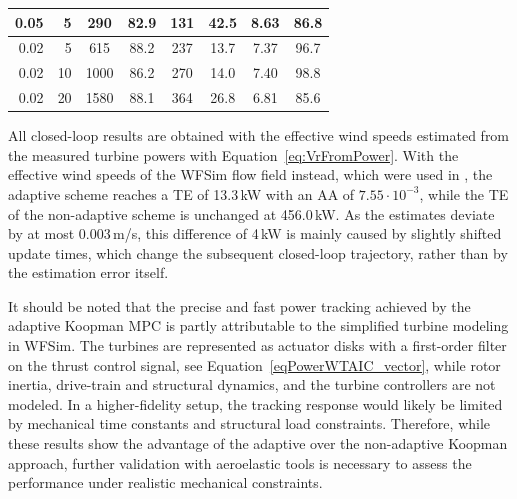 \begin{table}[htbp]
\begin{tabular}{rr cc cccc}
        0.05 & 5 & 290 & 82.9 & 131 & 42.5 & 8.63 & 86.8 \\
        \midrule
        0.02 & 5 & 615 & 88.2 & 237 & 13.7 & 7.37 & 96.7 \\
        0.02 & 10 & 1000 & 86.2 & 270 & 14.0 & 7.40 & 98.8 \\
        0.02 & 20 & 1580 & 88.1 & 364 & 26.8 & 6.81 & 85.6 \\
        \bottomrule
    \end{tabular}
\end{table}

All closed-loop results are obtained with the effective wind speeds estimated from the measured turbine powers with Equation~\eqref{eq:VrFromPower}. With the effective wind speeds of the WFSim flow field instead, which were used in \cite{dittmer2022data}, the adaptive scheme reaches a TE of 13.3\,kW with an AA of $7.55\cdot 10^{-3}$, while the TE of the non-adaptive scheme is unchanged at 456.0\,kW. As the estimates deviate by at most 0.003\,m/s, this difference of 4\,kW is mainly caused by slightly shifted update times, which change the subsequent closed-loop trajectory, rather than by the estimation error itself.

It should be noted that the precise and fast power tracking achieved by the adaptive Koopman MPC is partly attributable to the simplified turbine modeling in WFSim. The turbines are represented as actuator disks with a first-order filter on the thrust control signal, see Equation~\eqref{eqPowerWTAIC_vector}, while rotor inertia, drive-train and structural dynamics, and the turbine controllers are not modeled. In a higher-fidelity setup, the tracking response would likely be limited by mechanical time constants and structural load constraints. Therefore, while these results show the advantage of the adaptive over the non-adaptive Koopman approach, further validation with aeroelastic tools is necessary to assess the performance under realistic mechanical constraints.

